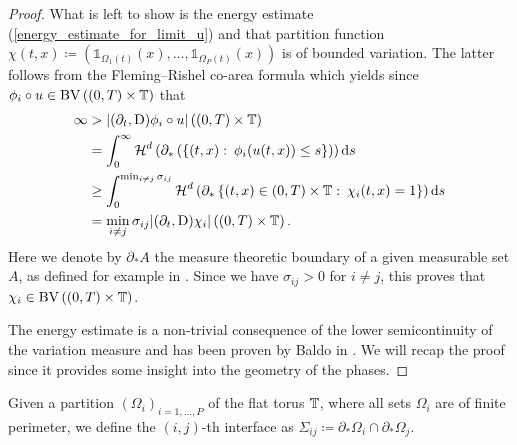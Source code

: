 \begin{proof}
 	What is left to show is the energy estimate (\ref{energy_estimate_for_limit_u}) and that partition function $ \chi ( t , x ) \coloneqq \left( \mathds{ 1 }_{ \Omega_{ 1 } ( t )  } ( x ) , \dotsc, \mathds{ 1 }_{ \Omega_{ P } ( t ) } ( x ) \right) $ is of bounded variation.
 	The latter follows from the Fleming--Rishel co-area formula \cite{Fleming_Rishel_coarea_formula} which yields since $ \phi_{ i } \circ u \in \operatorname{BV} \left( ( 0 , T ) \times \operatorname{\mathbb{T}} \right) $ that
 	\begin{align*}
 		\infty
 		& >
 		\abs{ 
 			( \partial_{ t } , \operatorname{D} )
 			\phi_{ i } \circ u
 		}
 		\left( ( 0 , T ) \times \operatorname{\mathbb{T}} \right)
 		\\
 		&
 		=
 		\int_{ 0 }^{ \infty }
 			\operatorname{\mathcal{H}}^{ d } \left(
 				\partial_{ \ast } \left(
 					\left\{
 						( t, x ) 
 						\, \colon \,
 						\phi_{ i } ( u ( t , x ) ) \leq s 
 					\right\}
 				 \right)
 			\right)
 		\dd{ s }
 		\\
 		&
 		\geq
 		\int_{ 0 }^{ \min_{ i \neq j } \sigma_{ i j } }
 			\operatorname{\mathcal{H}}^{ d } \left(
 				\partial_{ \ast }
 				\left\{
 					( t , x ) \in ( 0 , T ) \times \operatorname{\mathbb{T}} 
 					\, \colon \,
 					\chi_{ i } ( t , x ) = 1
 				\right\}
 			\right)
 		\dd{ s }
 		\\
 		&=
 		\min_{ i \neq j }
 			\sigma_{ i j }
 		\abs{
 			( \partial_{ t } , \operatorname{D} ) \chi_{ i }
 		}
 		\left(
 			( 0 , T ) \times \operatorname{\mathbb{T}}
 		\right).
 	\end{align*}
 	Here we denote by $ \partial_{ \ast } A $ the measure theoretic boundary of a given measurable set $ A $, as defined for example in \cite[Def.~5.7]{evans_gariepy_measure_theory_and_fine_props}.
 	Since we have $ \sigma_{ i j } > 0 $ for $ i \neq j $, this proves that $ 
 	\chi_{ i } \in \operatorname{BV} \left( ( 0, T ) \times \operatorname{\mathbb{T}} \right) $.
 	
 	The energy estimate is a non-trivial consequence of the lower semicontinuity of the variation measure and has been proven by Baldo in \cite{baldo_minimal_interface_criterion}. We will recap the proof since it provides some insight into the geometry of the phases.
\end{proof}

\begin{definition}
	Given a partition $ \left( \Omega_{ i } \right)_{ i = 1 , \dotsc , P } $ of 
	the flat torus $ \operatorname{\mathbb{T}} $, where all sets $ \Omega_{ i } $ are of 
	finite perimeter, we define the $ (i,j)$-th interface as $ \Sigma_{ i j } 
	\coloneqq \partial_{ \ast } \Omega_{ i } \cap \partial_{ \ast } \Omega_{ j 
	} $.
\end{definition}

